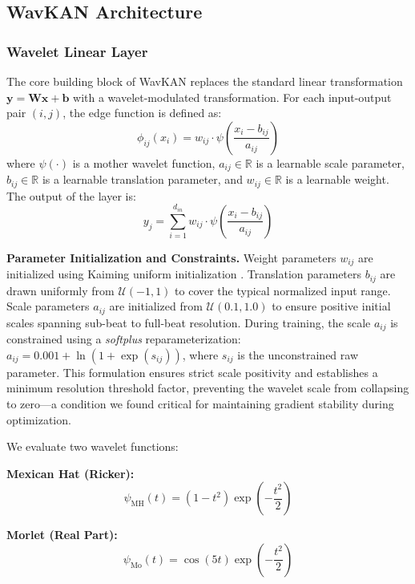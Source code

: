 \documentclass[journal,twoside,web]{ieeecolor}
\begin{document}
\subsection{WavKAN Architecture}

\subsubsection{Wavelet Linear Layer}
The core building block of WavKAN replaces the standard linear transformation $\mathbf{y} = \mathbf{Wx} + \mathbf{b}$ with a wavelet-modulated transformation. For each input-output pair $(i, j)$, the edge function is defined as:
\begin{equation}
    \phi_{ij}(x_i) = w_{ij} \cdot \psi\left(\frac{x_i - b_{ij}}{a_{ij}}\right)
\end{equation}
where $\psi(\cdot)$ is a mother wavelet function, $a_{ij} \in \mathbb{R}$ is a learnable scale parameter, $b_{ij} \in \mathbb{R}$ is a learnable translation parameter, and $w_{ij} \in \mathbb{R}$ is a learnable weight. The output of the layer is:
\begin{equation}
    y_j = \sum_{i=1}^{d_{in}} w_{ij} \cdot \psi\left(\frac{x_i - b_{ij}}{a_{ij}}\right)
\end{equation}

\textbf{Parameter Initialization and Constraints.} Weight parameters $w_{ij}$ are initialized using Kaiming uniform initialization \cite{he2015delving}. Translation parameters $b_{ij}$ are drawn uniformly from $\mathcal{U}(-1, 1)$ to cover the typical normalized input range. Scale parameters $a_{ij}$ are initialized from $\mathcal{U}(0.1, 1.0)$ to ensure positive initial scales spanning sub-beat to full-beat resolution. During training, the scale $a_{ij}$ is constrained using a \textit{softplus} reparameterization: $a_{ij} = 0.001 + \ln(1 + \exp(s_{ij}))$, where $s_{ij}$ is the unconstrained raw parameter. This formulation ensures strict scale positivity and establishes a minimum resolution threshold factor, preventing the wavelet scale from collapsing to zero---a condition we found critical for maintaining gradient stability during optimization.

We evaluate two wavelet functions:

\textbf{Mexican Hat (Ricker):}
\begin{equation}
    \psi_{\text{MH}}(t) = (1 - t^2) \exp\left(-\frac{t^2}{2}\right)
\end{equation}

\textbf{Morlet (Real Part):}
\begin{equation}
    \psi_{\text{Mo}}(t) = \cos(5t) \exp\left(-\frac{t^2}{2}\right)
\end{equation}
\end{document}
